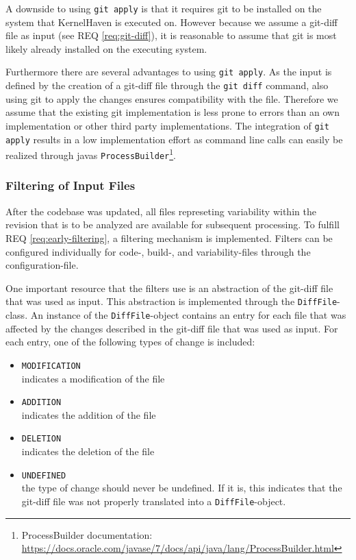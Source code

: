\documentclass[a4paper]{article}
\begin{document}
 A downside to using \texttt{git apply} is that it requires git to be installed on the system that KernelHaven is executed on. However because we assume a git-diff file as input (see REQ \ref{req:git-diff}), it is reasonable to assume that git is most likely already installed on the executing system.

Furthermore there are several advantages to using \texttt{git apply}. As the input is defined by the creation of a git-diff file through the \texttt{git diff} command, also using git to apply the changes ensures compatibility with the file. Therefore we assume that the existing git implementation is less prone to errors than an own implementation or other third party implementations. The integration of \texttt{git apply} results in a low implementation effort as command line calls can easily be realized through javas \texttt{ProcessBuilder}\footnote{ProcessBuilder documentation: \url{https://docs.oracle.com/javase/7/docs/api/java/lang/ProcessBuilder.html}}.

\subsubsection{Filtering of Input Files}\label{filtering-input}

After the codebase was updated, all files represeting variability within the revision that is to be analyzed are available for subsequent processing. To fulfill REQ \ref{req:early-filtering}, a filtering mechanism is implemented. Filters can be configured individually for code-, build-, and variability-files through the configuration-file.

One important resource that the filters use is an abstraction of the git-diff file that was used as input. This abstraction is implemented through the \texttt{DiffFile}-class.
An instance of the \texttt{DiffFile}-object contains an entry for each file that was affected by the changes described in the git-diff file that was used as input. For each entry, one of the following types of change is included:

\begin{itemize}
	\item \texttt{MODIFICATION} \\
	      indicates a modification of the file
	\item \texttt{ADDITION} \\
	      indicates the addition of the file
	\item \texttt{DELETION} \\
	      indicates the deletion of the file 
	\item \texttt{UNDEFINED} \\
	      the type of change should never be undefined. If it is, this indicates that the git-diff file was not properly translated into a \texttt{DiffFile}-object.
\end{itemize}
\end{document}
